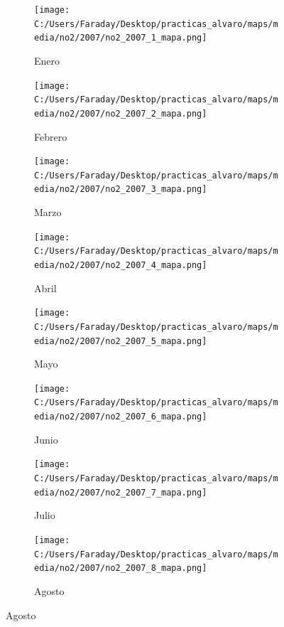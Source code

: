 \documentclass[12pt]{beamer}
\begin{document}
\begin{frame}[squeeze]
\tiny
\begin{figure}[H]
\centering
\begin{subfigure}[H]{0.20\textwidth}
\texttt{[image: C:/Users/Faraday/Desktop/practicas\_alvaro/maps/media/no2/2007/no2\_2007\_1\_mapa.png]}
\captionsetup{labelformat=empty}
\caption{\scriptsize Enero}
\label{fig:map-no2-2007-1}
\end{subfigure}
%
\begin{subfigure}[H]{0.20\textwidth}
\texttt{[image: C:/Users/Faraday/Desktop/practicas\_alvaro/maps/media/no2/2007/no2\_2007\_2\_mapa.png]}
\captionsetup{labelformat=empty}
\caption{\scriptsize Febrero}
\label{fig:map-no2-2007-2}
\end{subfigure}
%
\begin{subfigure}[H]{0.20\textwidth}
\texttt{[image: C:/Users/Faraday/Desktop/practicas\_alvaro/maps/media/no2/2007/no2\_2007\_3\_mapa.png]}
\captionsetup{labelformat=empty}
\caption{\scriptsize Marzo}
\label{fig:map-no2-2007-3}
\end{subfigure}
%
\begin{subfigure}[H]{0.20\textwidth}
\texttt{[image: C:/Users/Faraday/Desktop/practicas\_alvaro/maps/media/no2/2007/no2\_2007\_4\_mapa.png]}
\captionsetup{labelformat=empty}
\caption{\scriptsize Abril}
\label{fig:map-no2-2007-4}
\end{subfigure}

\begin{subfigure}[H]{0.20\textwidth}
\texttt{[image: C:/Users/Faraday/Desktop/practicas\_alvaro/maps/media/no2/2007/no2\_2007\_5\_mapa.png]}
\captionsetup{labelformat=empty}
\caption{\scriptsize Mayo}
\label{fig:map-no2-2007-5}
\end{subfigure}
%
\begin{subfigure}[H]{0.20\textwidth}
\texttt{[image: C:/Users/Faraday/Desktop/practicas\_alvaro/maps/media/no2/2007/no2\_2007\_6\_mapa.png]}
\captionsetup{labelformat=empty}
\caption{\scriptsize Junio}
\label{fig:map-no2-2007-6}
\end{subfigure}
%
\begin{subfigure}[H]{0.20\textwidth}
\texttt{[image: C:/Users/Faraday/Desktop/practicas\_alvaro/maps/media/no2/2007/no2\_2007\_7\_mapa.png]}
\captionsetup{labelformat=empty}
\caption{\scriptsize Julio}
\label{fig:map-no2-2007-7}
\end{subfigure}
%
\begin{subfigure}[H]{0.20\textwidth}
\texttt{[image: C:/Users/Faraday/Desktop/practicas\_alvaro/maps/media/no2/2007/no2\_2007\_8\_mapa.png]}
\captionsetup{labelformat=empty}
\caption{\scriptsize Agosto}
\label{fig:map-no2-2007-8}
\end{subfigure}


\end{figure}
\end{frame}
\end{document}
